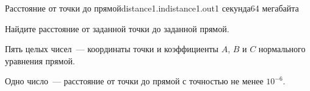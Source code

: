 \begin{problem}{Расстояние от точки до прямой}{distance1.in}{distance1.out}{1 секунда}{64 мегабайта}

Найдите расстояние от заданной точки до заданной прямой.

\InputFile

Пять целых чисел~--- координаты точки и коэффициенты $A$, $B$ и $C$ нормального уравнения прямой.

\OutputFile

Одно число~--- расстояние от точки до прямой с точностью не менее $10^{-6}$.

\Example

\begin{example}
%
\end{example}

\end{problem}
